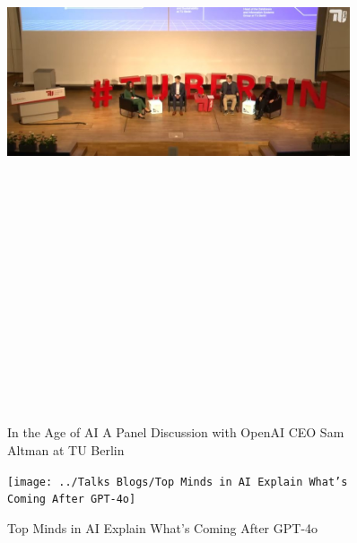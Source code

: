 \documentclass[a4paper,12pt]{article}
\begin{document}
\newpage
\vspace*{1cm}
\begin{figure}[h]
	\centering
	\includegraphics[width=0.9\textwidth, height=20cm, keepaspectratio]{../Talks Blogs/In the Age of AI A Panel Discussion with OpenAI CEO Sam Altman at TU Berlin}
	\caption{In the Age of AI A Panel Discussion with OpenAI CEO Sam Altman at TU Berlin}
\end{figure}

\vspace{0.5cm}
\begin{figure}[h]
	\centering
	\texttt{[image: ../Talks Blogs/Top Minds in AI Explain What’s Coming After GPT-4o]}
	\caption{Top Minds in AI Explain What’s Coming After GPT-4o}
\end{figure}
\end{document}

